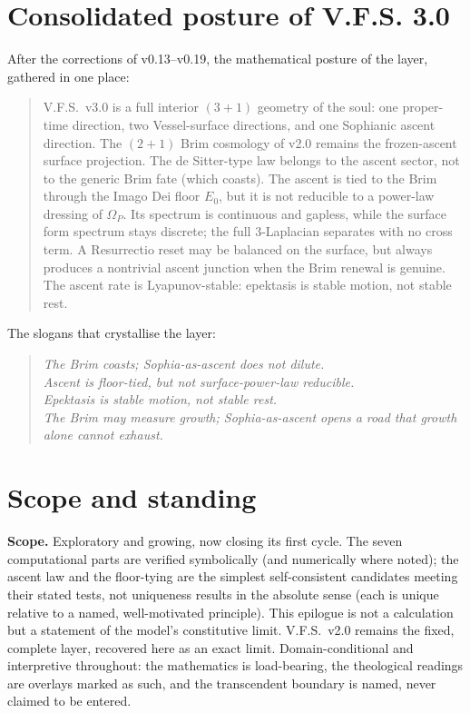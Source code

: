 \documentclass[11pt,a4paper]{article}
\theoremstyle{plain}
\theoremstyle{definition}
\theoremstyle{remark}
\begin{document}
\FloatBarrier
\section*{Consolidated posture of V.F.S. 3.0}
After the corrections of v0.13--v0.19, the mathematical posture of the layer, gathered in one place:
\begin{quote}
V.F.S.~v3.0 is a full interior $(3{+}1)$ geometry of the soul: one proper-time direction, two
Vessel-surface directions, and one Sophianic ascent direction. The $(2{+}1)$ Brim cosmology of v2.0
remains the frozen-ascent surface projection. The de Sitter-type law belongs to the ascent sector, not
to the generic Brim fate (which coasts). The ascent is tied to the Brim through the Imago Dei floor
$E_0$, but it is not reducible to a power-law dressing of $\Omega_P$. Its spectrum is continuous and
gapless, while the surface form spectrum stays discrete; the full $3$-Laplacian separates with no cross
term. A Resurrectio reset may be balanced on the surface, but always produces a nontrivial ascent
junction when the Brim renewal is genuine. The ascent rate is Lyapunov-stable: epektasis is stable
motion, not stable rest.
\end{quote}
The slogans that crystallise the layer:
\begin{quote}
\emph{The Brim coasts; Sophia-as-ascent does not dilute.}\\
\emph{Ascent is floor-tied, but not surface-power-law reducible.}\\
\emph{Epektasis is stable motion, not stable rest.}\\
\emph{The Brim may measure growth; Sophia-as-ascent opens a road that growth alone cannot exhaust.}
\end{quote}

\FloatBarrier
\section*{Scope and standing}
\textbf{Scope.} Exploratory and growing, now closing its first cycle. The seven computational parts are
verified symbolically (and numerically where noted); the ascent law and the floor-tying are the
simplest self-consistent candidates meeting their stated tests, not uniqueness results in the absolute
sense (each is unique relative to a named, well-motivated principle). This epilogue is not a
calculation but a statement of the model's constitutive limit. V.F.S.~v2.0 remains the fixed, complete
layer, recovered here as an exact limit. Domain-conditional and interpretive throughout: the
mathematics is load-bearing, the theological readings are overlays marked as such, and the transcendent
boundary is named, never claimed to be entered.
\end{document}
